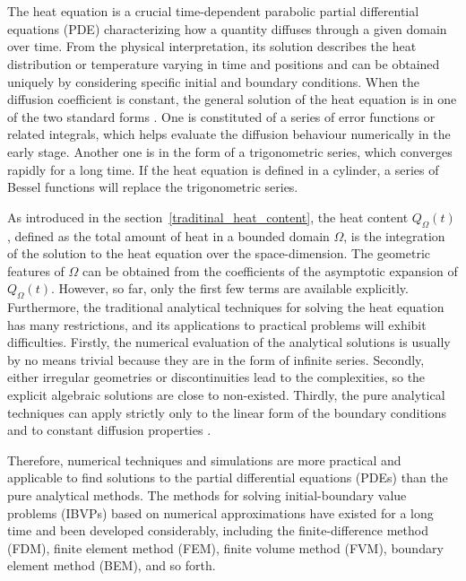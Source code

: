 \section{}\label{numerical_methdos}


The heat equation is a crucial time-dependent parabolic partial
differential equations (PDE) characterizing how a quantity diffuses
through a given domain over time. From the physical interpretation,
its solution describes the heat distribution or temperature varying in
time and positions and can be obtained uniquely by considering
specific initial and boundary conditions. When the diffusion
coefficient is constant, the general solution of the heat equation is
in one of the two standard forms \cite{crank1979mathematics}. One is
constituted of a series of error functions or related integrals, which
helps evaluate the diffusion behaviour numerically in the early
stage. Another one is in the form of a trigonometric series, which
converges rapidly for a long time. If the heat equation is defined in
a cylinder, a series of Bessel functions will replace the
trigonometric series. 


As introduced in the section~\ref{traditinal_heat_content}, the heat
content $Q_{\Omega}(t)$, defined as the total amount of heat in a
bounded domain $\Omega$, is the integration of the solution to the
heat equation over the space-dimension. The geometric features of
$\Omega$ can be obtained from the coefficients of the asymptotic
expansion of $Q_{\Omega}(t)$. However, so far, only the first few
terms are available explicitly. Furthermore, the traditional
analytical techniques for solving the heat equation has many
restrictions, and its applications to practical problems will exhibit
difficulties. Firstly, the numerical evaluation of the analytical
solutions is usually by no means trivial because they are in the form
of infinite series. Secondly, either irregular geometries or
discontinuities lead to the complexities, so the explicit algebraic
solutions are close to non-existed. Thirdly, the pure analytical
techniques can apply strictly only to the linear form of the boundary
conditions and to constant diffusion properties
\cite{crank1979mathematics}.


Therefore, numerical techniques and simulations are more practical and
applicable to find solutions to the partial differential equations
(PDEs) than the pure analytical methods. The methods for solving
initial-boundary value problems (IBVPs) based on numerical
approximations have existed for a long time and been developed
considerably, including the finite-difference method (FDM), finite
element method (FEM), finite volume method (FVM), boundary element
method (BEM), and so forth.





